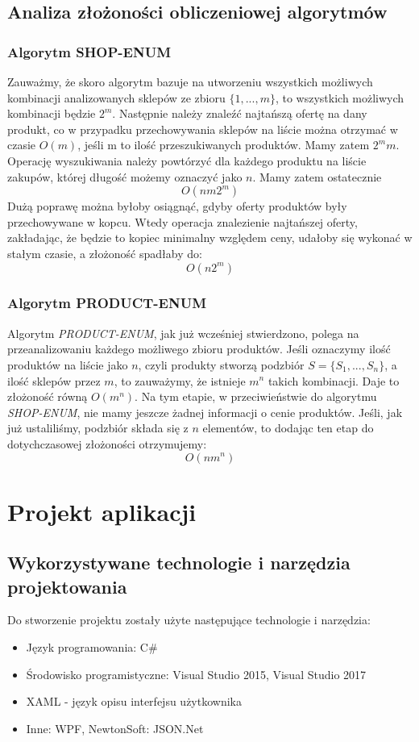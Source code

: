 \documentclass[a4paper]{article}
\let\oldsection\section
\renewcommand\section{\clearpage\oldsection}
\begin{document}
\subsection{Analiza złożoności obliczeniowej algorytmów}
\subsubsection{Algorytm SHOP-ENUM}
Zauważmy, że skoro algorytm bazuje na utworzeniu wszystkich możliwych kombinacji analizowanych sklepów ze zbioru $\{1,...,m\}$, to wszystkich możliwych kombinacji będzie $2^m$. Następnie należy znaleźć najtańszą ofertę na dany produkt, co w przypadku przechowywania sklepów na liście można otrzymać w czasie $O(m)$, jeśli m to ilość przeszukiwanych produktów. Mamy zatem $2^mm$. Operację wyszukiwania należy powtórzyć dla każdego produktu na liście zakupów, której długość możemy oznaczyć jako $n$. Mamy zatem ostatecznie
\begin{equation}
O(nm2^m)
\end{equation}
Dużą poprawę można byłoby osiągnąć, gdyby oferty produktów były przechowywane w kopcu. Wtedy operacja znalezienie najtańszej oferty, zakładając, że będzie to kopiec minimalny względem ceny, udałoby się wykonać w stałym czasie, a złożoność spadłaby do:
\begin{equation}
O(n2^m)
\end{equation}
\subsubsection{Algorytm PRODUCT-ENUM}
Algorytm \textit{PRODUCT-ENUM}, jak już wcześniej stwierdzono, polega na przeanalizowaniu każdego możliwego zbioru produktów. Jeśli oznaczymy ilość produktów na liście jako $n$, czyli produkty stworzą podzbiór $S = \{S_1,...,S_n\}$, a ilość sklepów przez $m$, to zauważymy, że istnieje $m^n$ takich kombinacji. Daje to złożoność równą $O(m^n)$. Na tym etapie, w przeciwieństwie do algorytmu \textit{SHOP-ENUM}, nie mamy jeszcze żadnej informacji o cenie produktów. Jeśli, jak już ustaliliśmy, podzbiór składa się z $n$ elementów, to dodając ten etap do dotychczasowej złożoności otrzymujemy:
\begin{equation}
O(nm^n)
\end{equation}
\section{Projekt aplikacji}
\subsection{Wykorzystywane technologie i narzędzia projektowania}
Do stworzenie projektu zostały użyte następujące technologie i narzędzia:
\begin{itemize}
\item Język programowania: C\#
\item Środowisko programistyczne: Visual Studio 2015, Visual Studio 2017
\item XAML - język opisu interfejsu użytkownika
\item Inne: WPF, NewtonSoft: JSON.Net
\end{itemize}
\end{document}
